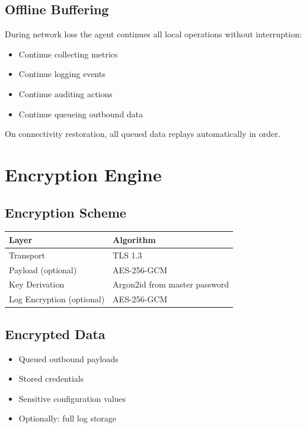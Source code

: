 \documentclass[12pt,a4paper]{article}
\begin{document}
\subsection{Offline Buffering}

During network loss the agent continues all local operations without interruption:

\begin{itemize}[noitemsep]
    \item Continue collecting metrics
    \item Continue logging events
    \item Continue auditing actions
    \item Continue queueing outbound data
\end{itemize}

On connectivity restoration, all queued data replays automatically in order.

\section{Encryption Engine}

\subsection{Encryption Scheme}

\begin{center}
\begin{tabular}{ll}
\toprule
Layer & Algorithm \\
\midrule
Transport                & TLS 1.3 \\
Payload (optional)       & AES-256-GCM \\
Key Derivation           & Argon2id from master password \\
Log Encryption (optional)& AES-256-GCM \\
\bottomrule
\end{tabular}
\end{center}

\subsection{Encrypted Data}

\begin{itemize}[noitemsep]
    \item Queued outbound payloads
    \item Stored credentials
    \item Sensitive configuration values
    \item Optionally: full log storage
\end{itemize}
\end{document}
